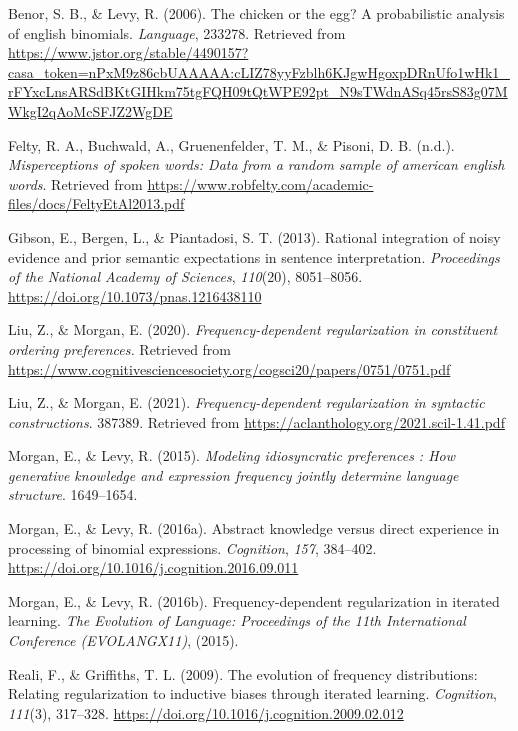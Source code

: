 \documentclass[
  jou,floatsintext]{apa6}
\newlength{\cslhangindent}
\newenvironment{CSLReferences}[2] %
 {\begin{list}{}{%
  \setlength{\itemindent}{0pt}
  \setlength{\leftmargin}{0pt}
  \setlength{\parsep}{0pt}
  \ifodd #1
   \setlength{\leftmargin}{\cslhangindent}
   \setlength{\itemindent}{-1\cslhangindent}
  \fi
  \setlength{\itemsep}{#2\baselineskip}}}
 {\end{list}}
\begin{document}
\label{refs}
\begin{CSLReferences}{1}{0}
Benor, S. B., \& Levy, R. (2006). The chicken or the egg? A probabilistic analysis of english binomials. \emph{Language}, 233278. Retrieved from \url{https://www.jstor.org/stable/4490157?casa_token=nPxM9z86cbUAAAAA:cLIZ78yyFzblh6KJgwHgoxpDRnUfo1wHk1_rFYxcLnsARSdBKtGIHkm75tgFQH09tQtWPE92pt_N9sTWdnASq45rsS83g07MWkgI2qAoMcSFJZ2WgDE}

Felty, R. A., Buchwald, A., Gruenenfelder, T. M., \& Pisoni, D. B. (n.d.). \emph{Misperceptions of spoken words: Data from a random sample of american english words}. Retrieved from \url{https://www.robfelty.com/academic-files/docs/FeltyEtAl2013.pdf}

Gibson, E., Bergen, L., \& Piantadosi, S. T. (2013). Rational integration of noisy evidence and prior semantic expectations in sentence interpretation. \emph{Proceedings of the National Academy of Sciences}, \emph{110}(20), 8051--8056. \url{https://doi.org/10.1073/pnas.1216438110}

Liu, Z., \& Morgan, E. (2020). \emph{Frequency-dependent regularization in constituent ordering preferences.} Retrieved from \url{https://www.cognitivesciencesociety.org/cogsci20/papers/0751/0751.pdf}

Liu, Z., \& Morgan, E. (2021). \emph{Frequency-dependent regularization in syntactic constructions}. 387389. Retrieved from \url{https://aclanthology.org/2021.scil-1.41.pdf}

Morgan, E., \& Levy, R. (2015). \emph{Modeling idiosyncratic preferences : How generative knowledge and expression frequency jointly determine language structure}. 1649--1654.

Morgan, E., \& Levy, R. (2016a). Abstract knowledge versus direct experience in processing of binomial expressions. \emph{Cognition}, \emph{157}, 384--402. \url{https://doi.org/10.1016/j.cognition.2016.09.011}

Morgan, E., \& Levy, R. (2016b). Frequency-dependent regularization in iterated learning. \emph{The Evolution of Language: Proceedings of the 11th International Conference (EVOLANGX11)}, (2015).

Reali, F., \& Griffiths, T. L. (2009). The evolution of frequency distributions: Relating regularization to inductive biases through iterated learning. \emph{Cognition}, \emph{111}(3), 317--328. \url{https://doi.org/10.1016/j.cognition.2009.02.012}

\end{CSLReferences}
\end{document}
